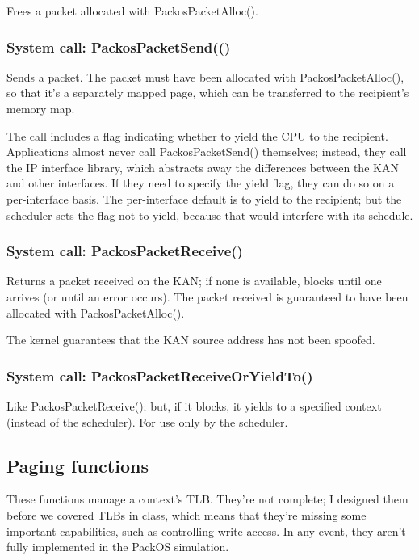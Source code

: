\documentclass{article}
\begin{document}
Frees a packet allocated with PackosPacketAlloc().

\subsubsection{System call: PackosPacketSend(()}

Sends a packet.  The packet must have been allocated with
PackosPacketAlloc(), so that it's a separately mapped page, which can
be transferred to the recipient's memory map.

The call includes a flag indicating whether to yield the CPU to the
recipient.  Applications almost never call PackosPacketSend()
themselves; instead, they call the IP interface library, which
abstracts away the differences between the KAN and other interfaces.
If they need to specify the yield flag, they can do so on a
per-interface basis.  The per-interface default is to yield to the
recipient; but the scheduler sets the flag not to yield, because that
would interfere with its schedule.

\subsubsection{System call: PackosPacketReceive()}

Returns a packet received on the KAN; if none is available, blocks
until one arrives (or until an error occurs).  The packet received is
guaranteed to have been allocated with PackosPacketAlloc().

The kernel guarantees that the KAN source address has not been
spoofed.

\subsubsection{System call: PackosPacketReceiveOrYieldTo()}

Like PackosPacketReceive(); but, if it blocks, it yields to a
specified context (instead of the scheduler).  For use only by the
scheduler.

\subsection{Paging functions}

These functions manage a context's TLB.  They're not complete; I
designed them before we covered TLBs in class, which means that
they're missing some important capabilities, such as controlling write
access.  In any event, they aren't fully implemented in the PackOS
simulation.
\end{document}
